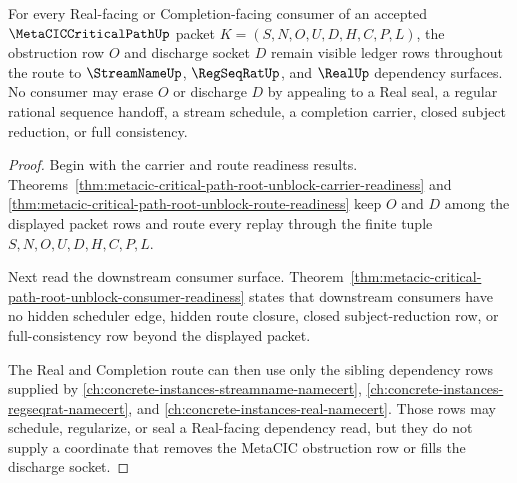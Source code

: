 \begin{theorem}
\label{thm:metacic-critical-path-phase-real-obstruction-ledger-lock}
For every Real-facing or Completion-facing consumer of an accepted $\MetaCICCriticalPathUp$ packet $K=(S,N,O,U,D,H,C,P,L)$, the obstruction row $O$ and discharge socket $D$ remain visible ledger rows throughout the route to $\StreamNameUp$, $\RegSeqRatUp$, and $\RealUp$ dependency surfaces. No consumer may erase $O$ or discharge $D$ by appealing to a Real seal, a regular rational sequence handoff, a stream schedule, a completion carrier, closed subject reduction, or full consistency.
\end{theorem}
\begin{proof}
Begin with the carrier and route readiness results. Theorems~\ref{thm:metacic-critical-path-root-unblock-carrier-readiness} and \ref{thm:metacic-critical-path-root-unblock-route-readiness} keep $O$ and $D$ among the displayed packet rows and route every replay through the finite tuple $S,N,O,U,D,H,C,P,L$.

Next read the downstream consumer surface. Theorem~\ref{thm:metacic-critical-path-root-unblock-consumer-readiness} states that downstream consumers have no hidden scheduler edge, hidden route closure, closed subject-reduction row, or full-consistency row beyond the displayed packet.

The Real and Completion route can then use only the sibling dependency rows supplied by \autoref{ch:concrete-instances-streamname-namecert}, \autoref{ch:concrete-instances-regseqrat-namecert}, and \autoref{ch:concrete-instances-real-namecert}. Those rows may schedule, regularize, or seal a Real-facing dependency read, but they do not supply a coordinate that removes the MetaCIC obstruction row or fills the discharge socket.
\end{proof}

